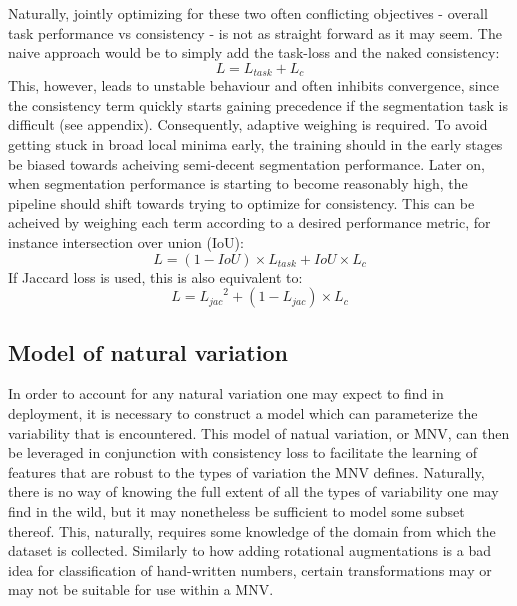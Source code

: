 	Naturally, jointly optimizing for these two often conflicting objectives - overall task performance vs consistency - is not as straight forward as it may seem. The naive approach would be to simply add the task-loss and the naked consistency:
	\begin{equation}
		L = L_{task} + L_c
	\end{equation}
	This, however, leads to unstable behaviour and often inhibits convergence, since the consistency term quickly starts gaining precedence if the segmentation task is difficult (see appendix). Consequently, adaptive weighing is required. To avoid getting stuck in broad local minima early, the training should in the early stages be biased towards acheiving semi-decent segmentation performance. Later on, when segmentation performance is starting to become reasonably high, the pipeline should shift towards trying to optimize for consistency. This can be acheived by weighing each term according to a desired performance metric, for instance intersection over union (IoU):
	\begin{equation}
		L = (1-IoU)\times L_{task} + IoU \times L_c
	\end{equation}
	If Jaccard loss is used, this is also equivalent to:
	\begin{equation}
		L = {L_{jac}}^2 + (1-L_{jac})\times L_c
	\end{equation}
	
  	\subsection{Model of natural variation}
  		In order to account for any natural variation one may expect to find in deployment, it is necessary to construct a model which can parameterize the variability that is encountered. This model of natual variation, or MNV, can then be leveraged in conjunction with consistency loss to facilitate the learning of features that are robust to the types of variation the MNV defines. Naturally, there is no way of knowing the full extent of all the types of variability one may find in the wild, but it may nonetheless be sufficient to model some subset thereof. This, naturally, requires some knowledge of the domain from which the dataset is collected. Similarly to how adding rotational augmentations is a bad idea for classification of hand-written numbers, certain transformations may or may not be suitable for use within a MNV.
  		
